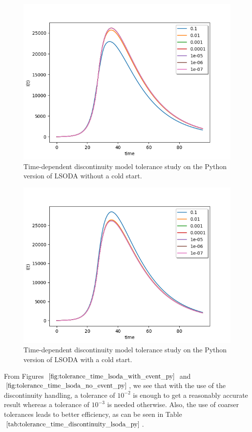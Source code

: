 \begin{figure}[H]
\centering
\includegraphics[width=0.7\linewidth]{./figures/tolerance_time_lsoda_no_event_py}
\caption{Time-dependent discontinuity model tolerance study on the Python version of LSODA without a cold start.}
\label{fig:tolerance_time_lsoda_no_event_py}
\end{figure}

\begin{figure}[H]
\centering
\includegraphics[width=0.7\linewidth]{./figures/tolerance_time_lsoda_with_event_py}
\caption{Time-dependent  discontinuity model tolerance study on the Python version of LSODA with a cold start.}
\label{fig:tolerance_time_lsoda_with_event_py}
\end{figure}

From Figures $\ref{fig:tolerance_time_lsoda_with_event_py}$ and $\ref{fig:tolerance_time_lsoda_no_event_py}$, we see that with the use of the discontinuity handling, a tolerance of $10^{-2}$ is enough to get a reasonably accurate result whereas a tolerance of $10^{-3}$ is needed otherwise. Also, the use of coarser tolerances leads to better efficiency, as can be seen in Table $\ref{tab:tolerance_time_discontinuity_lsoda_py}$.

